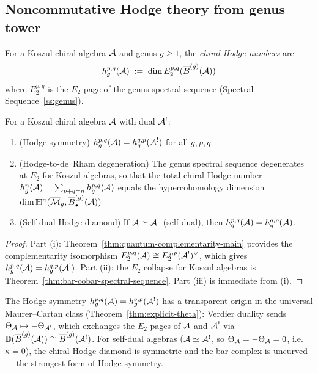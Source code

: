 \subsection{Noncommutative Hodge theory from genus tower}
\label{subsec:nc-hodge}

\begin{definition}\label{def:chiral-hodge-numbers}
For a Koszul chiral algebra $\mathcal{A}$ and genus $g \geq 1$, the
\emph{chiral Hodge numbers} are
\[
h^{p,q}_g(\mathcal{A})
\;:=\;
\dim E_2^{p,q}(\overline{B}^{(g)}(\mathcal{A}))
\]
where $E_2^{p,q}$ is the $E_2$ page of the genus spectral
sequence (Spectral Sequence~\ref{ss:genus}).
\end{definition}

\begin{proposition}\label{prop:nc-hodge-symmetry}
For a Koszul chiral algebra $\mathcal{A}$ with dual $\mathcal{A}^!$:
\begin{enumerate}[label=\textup{(\roman*)}]
\item \textup{(Hodge symmetry)}
  $h^{p,q}_g(\mathcal{A}) = h^{q,p}_g(\mathcal{A}^!)$ for all $g, p, q$.
\item \textup{(Hodge-to-de~Rham degeneration)}
  The genus spectral sequence degenerates at $E_2$
  for Koszul algebras, so that the total chiral Hodge number
  $h^n_g(\mathcal{A}) = \sum_{p+q=n} h^{p,q}_g(\mathcal{A})$
  equals the hypercohomology dimension
  $\dim \mathbb{H}^n(\overline{\mathcal{M}}_g,
  \overline{B}^{(g)}_\bullet(\mathcal{A}))$.
\item \textup{(Self-dual Hodge diamond)}
  If $\mathcal{A} \simeq \mathcal{A}^!$ \textup{(}self-dual\textup{)},
  then $h^{p,q}_g(\mathcal{A}) = h^{q,p}_g(\mathcal{A})$.
\end{enumerate}
\end{proposition}

\begin{proof}
Part (i): Theorem~\ref{thm:quantum-complementarity-main}
provides the complementarity isomorphism
$E_2^{p,q}(\mathcal{A}) \cong E_2^{q,p}(\mathcal{A}^!)^\vee$, which gives
$h^{p,q}_g(\mathcal{A}) = h^{q,p}_g(\mathcal{A}^!)$.  Part (ii): the $E_2$
collapse for Koszul algebras is
Theorem~\ref{thm:bar-cobar-spectral-sequence}.  Part (iii)
is immediate from (i).
\end{proof}

\begin{remark}
\label{rem:hodge-theta}
The Hodge symmetry $h^{p,q}_g(\mathcal{A}) = h^{q,p}_g(\mathcal{A}^!)$
has a transparent origin in the universal Maurer--Cartan
class (Theorem~\ref{thm:explicit-theta}): Verdier duality
sends $\Theta_{\mathcal{A}} \mapsto -\Theta_{\mathcal{A}^!}$, which
exchanges the $E_2$ pages of $\mathcal{A}$ and $\mathcal{A}^!$ via
$\mathbb{D}(\overline{B}^{(g)}(\mathcal{A})) \cong \overline{B}^{(g)}(\mathcal{A}^!)$.
For self-dual algebras ($\mathcal{A} \simeq \mathcal{A}^!$, so
$\Theta_{\mathcal{A}} = -\Theta_{\mathcal{A}} = 0$, i.e.\ $\kappa = 0$),
the chiral Hodge diamond is symmetric and the bar complex
is uncurved --- the strongest form of Hodge symmetry.
\end{remark}

